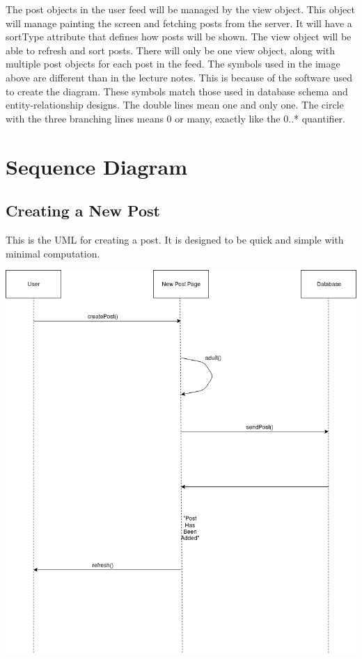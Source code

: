 \documentclass[12pt]{article}
\begin{document}
The post objects in the user feed will be managed by the view object.  This object will manage painting the screen and fetching posts from the server.  It will have a sortType attribute that defines how posts will be shown.  The view object will be able to refresh and sort posts.  There will only be one view object, along with multiple post objects for each post in the feed.
The symbols used in the image above are different than in the lecture notes.  This is because of the software used to create the diagram.  These symbols match those used in database schema and entity-relationship designs.  The double lines mean one and only one.  The circle with the three branching lines means 0 or many, exactly like the 0..* quantifier.

\section{Sequence Diagram}
\subsection{Creating a New Post}
This is the UML for creating a post. It is designed to be quick and simple with minimal computation.

\includegraphics[scale=0.50]{img/uml/createPost}
\end{document}
